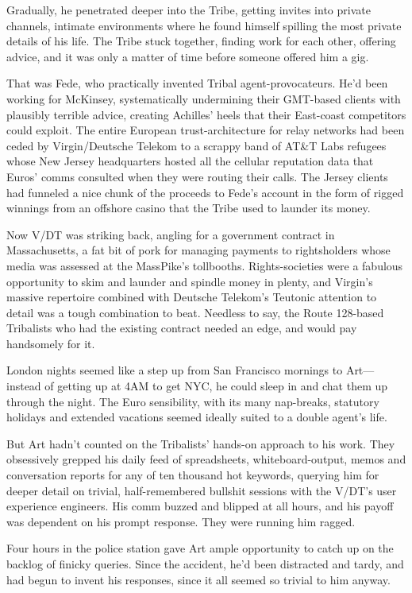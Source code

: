 Gradually, he penetrated deeper into the Tribe, getting invites
into private channels, intimate environments where he found himself
spilling the most private details of his life. The Tribe stuck
together, finding work for each other, offering advice, and it was
only a matter of time before someone offered him a gig.

That was Fede, who practically invented Tribal agent-provocateurs.
He’d been working for McKinsey, systematically undermining their
GMT-based clients with plausibly terrible advice, creating
Achilles’ heels that their East-coast competitors could exploit.
The entire European trust-architecture for relay networks had been
ceded by Virgin/Deutsche Telekom to a scrappy band of AT\&T Labs
refugees whose New Jersey headquarters hosted all the cellular
reputation data that Euros’ comms consulted when they were routing
their calls. The Jersey clients had funneled a nice chunk of the
proceeds to Fede’s account in the form of rigged winnings from an
offshore casino that the Tribe used to launder its money.

Now V/DT was striking back, angling for a government contract in
Massachusetts, a fat bit of pork for managing payments to
rightsholders whose media was assessed at the MassPike’s
tollbooths. Rights-societies were a fabulous opportunity to skim
and launder and spindle money in plenty, and Virgin’s massive
repertoire combined with Deutsche Telekom’s Teutonic attention to
detail was a tough combination to beat. Needless to say, the Route
128-based Tribalists who had the existing contract needed an edge,
and would pay handsomely for it.

London nights seemed like a step up from San Francisco mornings to
Art—instead of getting up at 4AM to get NYC, he could sleep in and
chat them up through the night. The Euro sensibility, with its many
nap-breaks, statutory holidays and extended vacations seemed
ideally suited to a double agent’s life.

But Art hadn’t counted on the Tribalists’ hands-on approach to his
work. They obsessively grepped his daily feed of spreadsheets,
whiteboard-output, memos and conversation reports for any of ten
thousand hot keywords, querying him for deeper detail on trivial,
half-remembered bullshit sessions with the V/DT’s user experience
engineers. His comm buzzed and blipped at all hours, and his payoff
was dependent on his prompt response. They were running him
ragged.

Four hours in the police station gave Art ample opportunity to
catch up on the backlog of finicky queries. Since the accident,
he’d been distracted and tardy, and had begun to invent his
responses, since it all seemed so trivial to him anyway.

